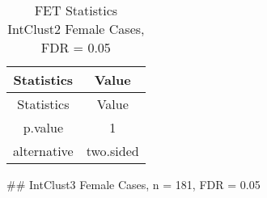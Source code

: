 \documentclass[]{article}
\begin{document}
\begin{longtable}[]{@{}cc@{}}
\caption{FET Statistics IntClust2 Female Cases, FDR =
0.05}\tabularnewline
\toprule
\begin{minipage}[b]{0.18\columnwidth}\centering\strut
Statistics\strut
\end{minipage} & \begin{minipage}[b]{0.14\columnwidth}\centering\strut
Value\strut
\end{minipage}\tabularnewline
\midrule
\endfirsthead
\toprule
\begin{minipage}[b]{0.18\columnwidth}\centering\strut
Statistics\strut
\end{minipage} & \begin{minipage}[b]{0.14\columnwidth}\centering\strut
Value\strut
\end{minipage}\tabularnewline
\midrule
\endhead
\begin{minipage}[t]{0.18\columnwidth}\centering\strut
p.value\strut
\end{minipage} & \begin{minipage}[t]{0.14\columnwidth}\centering\strut
1\strut
\end{minipage}\tabularnewline
\begin{minipage}[t]{0.18\columnwidth}\centering\strut
alternative\strut
\end{minipage} & \begin{minipage}[t]{0.14\columnwidth}\centering\strut
two.sided\strut
\end{minipage}\tabularnewline
\bottomrule
\end{longtable}

\pagebreak
\#\# IntClust3 Female Cases, n = 181, FDR = 0.05
\end{document}

